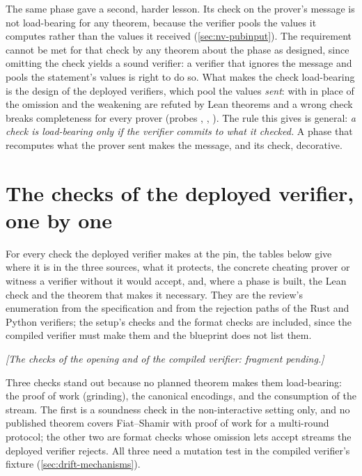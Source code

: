 The same phase gave a second, harder lesson. Its check on the prover's message is not
load-bearing for any theorem, because the verifier pools the values it computes rather than the
values it received (\cref{sec:nv-pubinput}). The requirement cannot be met for that check by
any theorem about the phase as designed, since omitting the check yields a sound verifier: a
verifier that ignores the message and pools the statement's values is right to do so. What
makes the check load-bearing is the design of the deployed verifiers, which pool the values
\emph{sent}: with  in place of  the omission and the weakening are
refuted by Lean theorems and a wrong check breaks completeness for every prover (probes
, , ). The rule this gives is general:
\emph{a check is load-bearing only if the verifier commits to what it checked.} A phase that
recomputes what the prover sent makes the message, and its check, decorative.

\section{The checks of the deployed verifier, one by one}\label{sec:drift-checks}

For every check the deployed verifier makes at the pin, the tables below give where it is in
the three sources, what it protects, the concrete cheating prover or witness a verifier
without it would accept, and, where a phase is built, the Lean check and the theorem that
makes it necessary. They are the review's enumeration from the specification and from the
rejection paths of the Rust and Python verifiers; the setup's checks and the format checks are
included, since the compiled verifier must make them and the blueprint does not list them.

\ifopeningready{}\else\emph{[The checks of the opening and of the compiled verifier: fragment pending.]}\fi

Three checks stand out because no planned theorem makes them load-bearing: the proof of work
(grinding), the canonical encodings, and the consumption of the stream. The first is a soundness
check in the non-interactive setting only, and no published theorem covers Fiat--Shamir with
proof of work for a multi-round protocol; the other two are format checks whose omission lets
 accept streams the deployed verifier rejects. All three need a mutation test in
the compiled verifier's fixture (\cref{sec:drift-mechanisms}).

